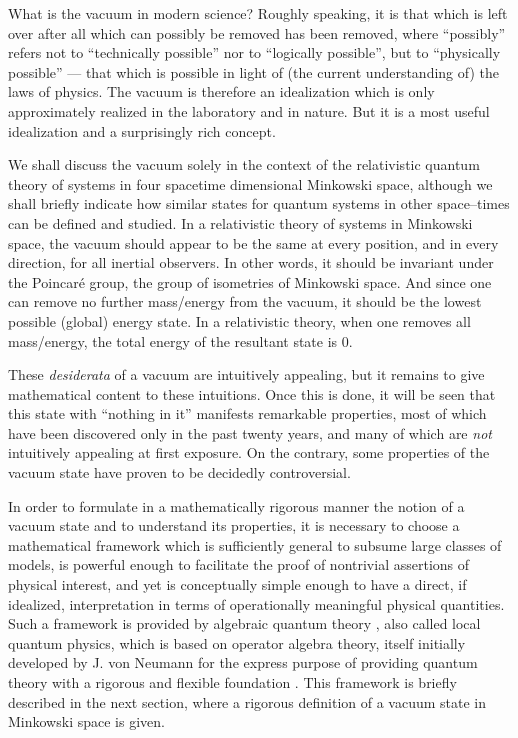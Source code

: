\documentclass[12pt]{article}
\begin{document}
     What is the vacuum in modern science? Roughly speaking, it is
that which is left over after all which can possibly be removed has
been removed, where ``possibly'' refers not to ``technically
possible'' nor to ``logically possible'', but to ``physically possible''
--- that which is possible in light of (the current understanding of)
the laws of physics. The vacuum is therefore an idealization which is
only approximately realized in the laboratory and in nature. But it 
is a most useful idealization and a surprisingly rich concept.

     We shall discuss the vacuum solely in the context of the
relativistic quantum theory of systems in four spacetime dimensional
Minkowski space, although we shall briefly indicate how similar states
for quantum systems in other space--times can be defined and
studied. In a relativistic theory of systems in Minkowski space, the
vacuum should appear to be the same at every position, and in every
direction, for all inertial observers. In other words, it should
be invariant under the Poincar\'e group, the group of isometries of
Minkowski space. And since one can remove no further mass/energy from the
vacuum, it should be the lowest possible (global) energy state.
In a relativistic theory, when one removes all mass/energy, the total
energy of the resultant state is 0. 

     These {\it desiderata} of a vacuum are intuitively appealing, but
it remains to give mathematical content to these intuitions. Once this
is done, it will be seen that this state with ``nothing in it''
manifests remarkable properties, most of which have been discovered
only in the past twenty years, and many of which are {\it not} intuitively
appealing at first exposure. On the contrary, some properties of the
vacuum state have proven to be decidedly controversial.

     In order to formulate in a mathematically rigorous manner the
notion of a vacuum state and to understand its properties, it is
necessary to choose a mathematical framework which is sufficiently
general to subsume large classes of models, is powerful enough to
facilitate the proof of nontrivial assertions of physical interest,
and yet is conceptually simple enough to have a direct, if idealized,
interpretation in terms of operationally meaningful physical
quantities. Such a framework is provided by algebraic
quantum theory \cite{Em,Ar,BrRo1,BrRo2,Haag}, also called local quantum
physics, which is based on operator algebra theory, itself initially
developed by J. von Neumann for the express purpose of providing
quantum theory with a rigorous and flexible foundation \cite{Neu,NeuI}. 
This framework is briefly described in the next section, where a
rigorous definition of a vacuum state in Minkowski space is given.
\end{document}
